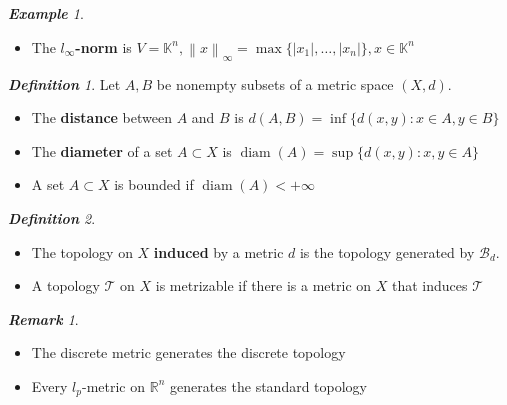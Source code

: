 \documentclass[frenchspacing,9pt,landscape,a4paper]{article}
\newcommand{\BR}{\mathbb R}
\newcommand{\abs}[1]{\left\lvert #1 \right\rvert}
\newcommand{\norm}[1]{\left\lVert #1 \right\rVert}
\DeclareMathOperator{\diam}{diam}
\theoremstyle{remark}
\newtheorem*{defn}{\textbf{Definition}}
\newtheorem*{rem}{\textbf{Remark}}
\newtheorem*{eg}{\textbf{Example}}
\begin{document}
\begin{multicols}{4}
\begin{eg}
\begin{itemize}
    \item The \textbf{$l_\infty$-norm} is
        $V=\mathbb{K}^n,\norm{x}_\infty=\max\{\abs{x_1},\dots,\abs{x_n}\},x\in\mathbb{K}^n$
\end{itemize}    
\end{eg}
\begin{defn}
    Let $A,B$ be nonempty subsets of a metric space  $(X,d)$.
     \begin{itemize}
         \item The \textbf{distance} between $A$ and  $B$ is  $d(A,B)=\inf\{d(x,y):x\in A,y\in B\}$
         \item The \textbf{diameter} of a set  $A\subset X$ is  $\diam(A)=\sup\{d(x,y):x,y\in A\}$
         \item A set $A\subset X$ is bounded if  $\diam(A)<+\infty$
    \end{itemize}
\end{defn}
\begin{defn}
    \begin{itemize}
        \item The topology on $X$ \textbf{induced} by a metric  $d$ is the topology generated by
            $\mathcal{B}_d$.
        \item A topology  $\mathcal{T}$ on  $X$ is metrizable if there is a metric on  $X$ that induces
            $\mathcal{T}$
    \end{itemize}
\end{defn}
\begin{rem}
\begin{itemize}
    \item The discrete metric generates the discrete topology
    \item Every $l_p$-metric on  $\BR^n$ generates the standard topology
\end{itemize} 
\end{rem}

\end{multicols}
\end{document}
